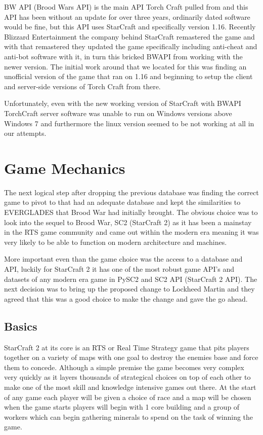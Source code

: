 \documentclass[a4paper,12pt]{report}
\begin{document}
BW API (Brood Wars API) is the main API Torch Craft pulled from and this API has been without an update for over three years, ordinarily dated software would be fine, but this API uses StarCraft and specifically version 1.16. Recently Blizzard Entertainment the company behind StarCraft remastered the game and with that remastered they updated the game specifically including anti-cheat and anti-bot software with it, in turn this bricked BWAPI from working with the newer version. The initial work around that we located for this was finding an unofficial version of the game that ran on 1.16 and beginning to setup the client and server-side versions of Torch Craft from there. 

Unfortunately, even with the new working version of StarCraft with BWAPI TorchCraft server software was unable to run on Windows versions above Windows 7 and furthermore the linux version seemed to be not working at all in our attempts.

\section{Game Mechanics}

The next logical step after dropping the previous database was finding the correct game to pivot to that had an adequate database and kept the similarities to EVERGLADES that Brood War had initially brought. The obvious choice was to look into the sequel to Brood War, SC2 (StarCraft 2) as it has been a mainstay in the RTS game community and came out within the modern era meaning it was very likely to be able to function on modern architecture and machines.

More important even than the game choice was the access to a database and API, luckily for StarCraft 2 it has one of the most robust game API’s and datasets of any modern era game in PySC2 and SC2 API (StarCraft 2 API). The next decision was to bring up the proposed change to Lockheed Martin and they agreed that this was a good choice to make the change and gave the go ahead.

\subsection{Basics}

StarCraft 2 at its core is an RTS or Real Time Strategy game that pits players together on a variety of maps with one goal to destroy the enemies base and force them to concede. Although a simple premise the game becomes very complex very quickly as it layers thousands of strategical choices on top of each other to make one of the most skill and knowledge intensive games out there. At the start of any game each player will be given a choice of race and a map will be chosen when the game starts players will begin with 1 core building and a group of workers which can begin gathering minerals to spend on the task of winning the game.
\end{document}
